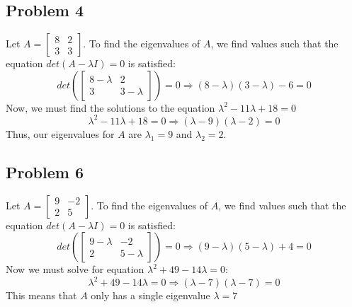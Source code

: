 \documentclass{article}%
\begin{document}
\subsection*{Problem 4}

Let $A =
\begin{bmatrix}
    8 & 2 \\
    3 & 3
\end{bmatrix}$. To find the eigenvalues of $A$, we find values such that the equation $det(A - \lambda I) = 0$ is satisfied:
$$
det\left(
\begin{bmatrix}
    8 - \lambda & 2 \\
    3 & 3 - \lambda
\end{bmatrix}
\right) = 0
\Rightarrow
(8 - \lambda)(3 - \lambda) - 6 = 0
$$
Now, we must find the solutions to the equation $\lambda^2 - 11\lambda + 18 = 0$
$$
\lambda^2 - 11\lambda + 18 = 0
\Rightarrow
(\lambda - 9)(\lambda - 2) = 0
$$
Thus, our eigenvalues for $A$ are $\lambda_1 = 9$ and $\lambda_2 = 2$.

\subsection*{Problem 6}

Let $A =
\begin{bmatrix}
    9 & -2 \\
    2 & 5
\end{bmatrix}$. To find the eigenvalues of $A$, we find values such that the equation $det(A - \lambda I) = 0$ is satisfied:
$$
det\left(
\begin{bmatrix}
    9 - \lambda & -2 \\
    2 & 5 - \lambda
\end{bmatrix}
\right) = 0
\Rightarrow
(9 - \lambda)(5 - \lambda) + 4 = 0
$$
Now we must solve for equation $\lambda^2 + 49 - 14\lambda = 0$:
$$
\lambda^2 + 49 - 14\lambda = 0
\Rightarrow
(\lambda - 7)(\lambda - 7) = 0
$$
This means that $A$ only has a single eigenvalue $\lambda = 7$
\end{document}
